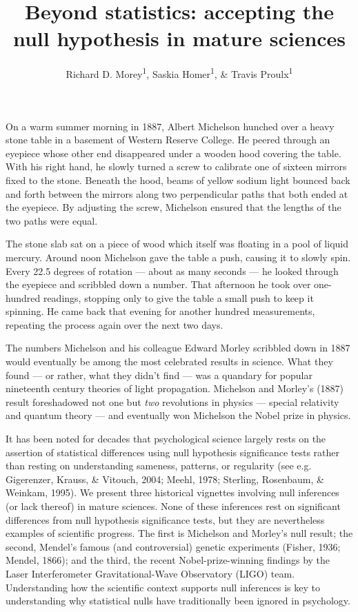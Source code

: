\documentclass[english,floatsintext,man]{apa6}
\title{Beyond statistics: accepting the null hypothesis in mature sciences}
\author{Richard D. Morey\textsuperscript{1}, Saskia Homer\textsuperscript{1}, \& Travis Proulx\textsuperscript{1}}
\affiliation{
    \vspace{0.5cm}
          \textsuperscript{1} School of Psychology, Cardiff University  }
\theoremstyle{definition}
\theoremstyle{definition}
\theoremstyle{definition}
\theoremstyle{remark}
\begin{document}
\maketitle

\setcounter{secnumdepth}{0}



On a warm summer morning in 1887, Albert Michelson hunched over a heavy
stone table in a basement of Western Reserve College. He peered through
an eyepiece whose other end disappeared under a wooden hood covering the
table. With his right hand, he slowly turned a screw to calibrate one of
sixteen mirrors fixed to the stone. Beneath the hood, beams of yellow
sodium light bounced back and forth between the mirrors along two
perpendicular paths that both ended at the eyepiece. By adjusting the
screw, Michelson ensured that the lengths of the two paths were equal.

The stone slab sat on a piece of wood which itself was floating in a
pool of liquid mercury. Around noon Michelson gave the table a push,
causing it to slowly spin. Every 22.5 degrees of rotation --- about as
many seconds --- he looked through the eyepiece and scribbled down a
number. That afternoon he took over one-hundred readings, stopping only
to give the table a small push to keep it spinning. He came back that
evening for another hundred measurements, repeating the process again
over the next two days.

The numbers Michelson and his colleague Edward Morley scribbled down in
1887 would eventually be among the most celebrated results in science.
What they found --- or rather, what they didn't find --- was a quandary
for popular nineteenth century theories of light propagation. Michelson
and Morley's (1887) result foreshadowed not one but \emph{two}
revolutions in physics --- special relativity and quantum theory --- and
eventually won Michelson the Nobel prize in physics.

It has been noted for decades that psychological science largely rests
on the assertion of statistical differences using null hypothesis
significance tests rather than resting on understanding sameness,
patterns, or regularity (see e.g. Gigerenzer, Krauss, \& Vitouch, 2004;
Meehl, 1978; Sterling, Rosenbaum, \& Weinkam, 1995). We present three
historical vignettes involving null inferences (or lack thereof) in
mature sciences. None of these inferences rest on significant
differences from null hypothesis significance tests, but they are
nevertheless examples of scientific progress. The first is Michelson and
Morley's null result; the second, Mendel's famous (and controversial)
genetic experiments (Fisher, 1936; Mendel, 1866); and the third, the
recent Nobel-prize-winning findings by the Laser Interferometer
Gravitational-Wave Observatory (LIGO) team. Understanding how the
scientific context supports null inferences is key to understanding why
statistical nulls have traditionally been ignored in psychology.
\end{document}
